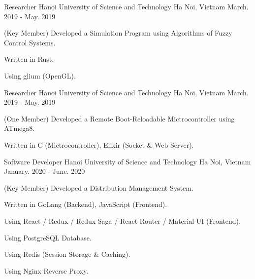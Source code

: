 \begin{cventries}

\cventry
{Researcher} %
{Hanoi University of Science and Technology} %
{Ha Noi, Vietnam} %
{March. 2019 - May. 2019} %
{ %
\begin{cvitems}
\item{(Key Member) Developed a Simulation Program using Algorithms of Fuzzy Control Systems.}
\item{Written in Rust.}
\item{Using glium (OpenGL).}
\end{cvitems}
}


\cventry
{Researcher} %
{Hanoi University of Science and Technology} %
{Ha Noi, Vietnam} %
{March. 2019 - May. 2019} %
{ %
\begin{cvitems}
\item{(One Member) Developed a Remote Boot-Reloadable Mictrocontroller using ATmega8.}
\item{Written in C (Mictrocontroller), Elixir (Socket \& Web Server).}
\end{cvitems}
}


\cventry
{Software Developer} %
{Hanoi University of Science and Technology} %
{Ha Noi, Vietnam} %
{January. 2020 - June. 2020} %
{ %
\begin{cvitems}
\item{(Key Member) Developed a Distribution Management System.}
\item{Written in GoLang (Backend), JavaScript (Frontend).}
\item{Using React / Redux / Redux-Saga / React-Router / Material-UI (Frontend).}
\item{Using PostgreSQL Database.}
\item{Using Redis (Session Storage \& Caching).}
\item{Using Nginx Reverse Proxy.}
\end{cvitems}
}


\end{cventries}
